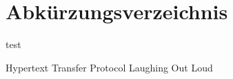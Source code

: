 
\chapter*{Abkürzungsverzeichnis}
test
\begin{acronym}
  {Hypertext Transfer Protocol}
  {Laughing Out Loud}
\end{acronym}